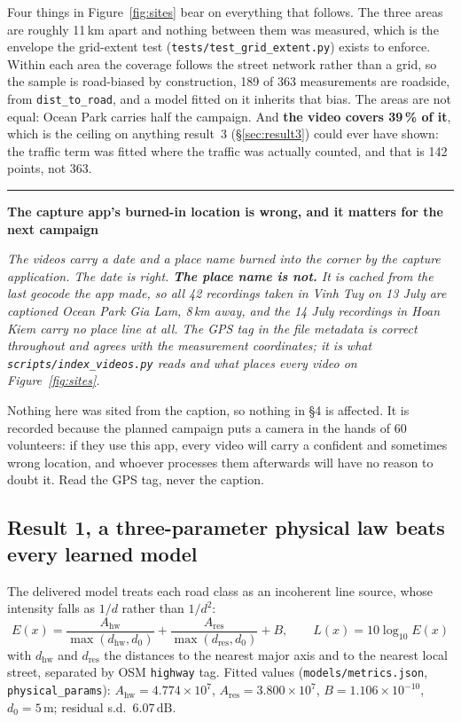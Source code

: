 \documentclass[11pt,a4paper]{article}
\newcommand{\dB}{\ensuremath{\,\mathrm{dB}}}
\newcommand{\pth}[1]{\texttt{\small #1}}
\newenvironment{caveat}[1]
 {\par\medskip\noindent\begin{minipage}{\linewidth}%
 \color{warnc}\rule{2pt}{\baselineskip}\hspace{.6em}\textbf{#1}\par\vspace{.2em}
 \hspace*{1.4em}\begin{minipage}{\dimexpr\linewidth-1.4em\relax}\small\itshape}
 {\end{minipage}\end{minipage}\par\medskip}
\begin{document}
\noindent Four things in Figure~\ref{fig:sites} bear on everything that
follows. The three areas are roughly 11\,km apart and nothing between them was
measured, which is the envelope the grid-extent test
(\pth{tests/test\_grid\_extent.py}) exists to enforce. Within each area the
coverage follows the street network rather than a grid, so the sample is
road-biased by construction, 189 of 363 measurements are roadside, from
\pth{dist\_to\_road}, and a model fitted on it inherits that bias. The areas
are not equal: Ocean Park carries half the campaign. And \textbf{the video
covers 39\,\% of it}, which is the ceiling on anything result~3
(§\ref{sec:result3}) could ever have shown: the traffic term was fitted where
the traffic was actually counted, and that is 142 points, not 363.

\begin{caveat}{The capture app's burned-in location is wrong, and it matters
for the next campaign}\label{sec:videocaveat}
The videos carry a date and a place name burned into the corner by the capture
application. The date is right. \textbf{The place name is not.} It is cached
from the last geocode the app made, so all 42 recordings taken in Vinh Tuy on
13 July are captioned \emph{Ocean Park Gia Lam}, 8\,km away, and the 14
July recordings in Hoan Kiem carry no place line at all. The GPS tag in the
file metadata is correct throughout and agrees with the measurement
coordinates; it is what \pth{scripts/index\_videos.py} reads and what places
every video on Figure~\ref{fig:sites}.

Nothing here was sited from the caption, so nothing in §4 is affected. It is
recorded because the planned campaign puts a camera in the hands of 60
volunteers: if they use this app, every video will carry a confident and
sometimes wrong location, and whoever processes them afterwards will have no
reason to doubt it. Read the GPS tag, never the caption.
\end{caveat}

\subsection{Result 1, a three-parameter physical law beats every learned model}

The delivered model treats each road class as an incoherent line source, whose
intensity falls as $1/d$ rather than $1/d^{2}$:
\[
E(x) = \frac{A_{\mathrm{hw}}}{\max(d_{\mathrm{hw}}, d_0)}
 + \frac{A_{\mathrm{res}}}{\max(d_{\mathrm{res}}, d_0)} + B,
\qquad L(x) = 10\log_{10} E(x)
\]
with $d_{\mathrm{hw}}$ and $d_{\mathrm{res}}$ the distances to the nearest major
axis and to the nearest local street, separated by OSM \pth{highway} tag. Fitted
values (\pth{models/metrics.json}, \pth{physical\_params}):
$A_{\mathrm{hw}} = 4.774\times10^{7}$,
$A_{\mathrm{res}} = 3.800\times10^{7}$,
$B = 1.106\times10^{-10}$, $d_0 = 5$\,m; residual s.d.\ 6.07\dB.
\end{document}
